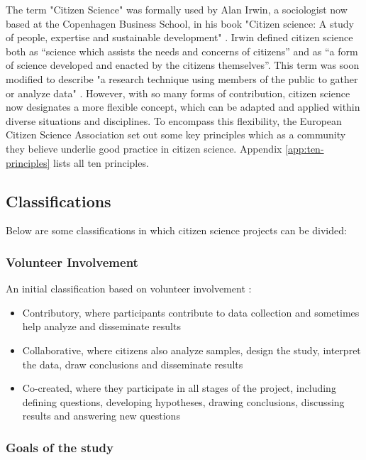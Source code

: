 The term "Citizen Science" was formally used by Alan Irwin, a sociologist now based at the Copenhagen Business School, in his book "Citizen science: A study of people, expertise and sustainable development" \cite{irwin1995citizen}. Irwin defined citizen science both as “science which assists the needs and concerns of citizens” and as “a form of science developed and enacted by the citizens themselves”. This term was soon modified to describe "a research technique using members of the public to gather or analyze data" \cite{bonney2009citizen}. However, with so many forms of contribution, citizen science now designates a more flexible concept, which can be adapted and applied within diverse situations and disciplines. To encompass this flexibility, the European Citizen Science Association \cite{robinson2018ten} set out some key principles which as a community they believe underlie good practice in citizen science. Appendix \ref{app:ten-principles} lists all ten principles.

\subsection{Classifications}

Below are some classifications in which citizen science projects can be divided:

\subsubsection{Volunteer Involvement}

An initial classification based on volunteer involvement \cite{follett2015analysis}: 
\begin{itemize}
    \item Contributory, where participants contribute to data collection and sometimes help analyze and disseminate results
    \item Collaborative, where citizens also analyze samples, design the study, interpret the data, draw conclusions and disseminate results
    \item Co-created, where they participate in all stages of the project, including defining questions, developing hypotheses, drawing conclusions, discussing results and answering new questions
\end{itemize}

\subsubsection{Goals of the study}

